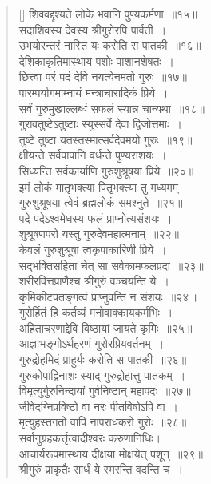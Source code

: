 \documentclass[twoside,12pt,notitlepage]{book}
\begin{document}
\begin{verse}[\versewidth]
शिववद्दृश्यते लोके भवानि पुण्यकर्मणा~॥१५॥\\
सदाशिवस्य देवस्य श्रीगुरोरपि पार्वती~।\\[-6pt]
उभयोरन्तरं नास्ति यः करोति स पातकी~॥१६॥\\
देशिकाकृतिमास्थाय पशोः पाशानशेषतः~।\\[-6pt]
छित्त्वा परं पदं देवि नयत्येनमतो गुरुः~॥१७॥\footA  \\
पारम्पर्यागमाम्नायं मन्त्राचारादिकं प्रिये~।\\[-6pt]
सर्वं गुरुमुखाल्लब्धं सफलं स्यान्न चान्यथा~॥१८॥\\
गुरावतुष्टेऽतुष्टाः स्युस्सर्वे देवा द्विजोत्तमाः~।\\[-6pt]
तुष्टे तुष्टा यतस्तस्मात्सर्वदेवमयो गुरुः~॥१९॥\\
क्षीयन्ते सर्वपापानि वर्धन्ते पुण्यराशयः~।\\[-6pt]
सिध्यन्ति सर्वकार्याणि गुरुशुश्रूषया प्रिये~॥२०॥\\
इमं लोकं मातृभक्त्या पितृभक्त्या तु मध्यमम्~।\\[-6pt]
गुरुशुश्रूषया त्वेवं ब्रह्मलोकं समश्नुते~॥२१॥\\
पदे पदेऽश्वमेधस्य फलं प्राप्नोत्यसंशयः~।\\[-6pt]
शुश्रूषणपरो यस्तु गुरुदेवमहात्मनाम्~॥२२॥\\
केवलं गुरुशुश्रूषा त्वकृपाकारिणी प्रिये~।\\[-6pt]
सद्भक्तिसहिता चेत् सा सर्वकामफलप्रदा~॥२३॥\\
शरीरवित्तप्राणैश्च श्रीगुरुं वञ्चयन्ति ये~।\\[-6pt]
कृमिकीटपतङ्गत्वं प्राप्नुवन्ति न संशयः~॥२४॥\\
गुरोर्हितं हि कर्तव्यं मनोवाक्कायकर्मभिः~।\\[-6pt]
अहिताचरणाद्देवि विष्ठायां जायते कृमिः~॥२५॥\\
आज्ञाभङ्गोऽर्थहरणं गुरोरप्रियवर्तनम्~।\\[-6pt]
गुरुद्रोहमिदं प्राहुर्यः करोति स पातकी~॥२६॥\\
गुरुकोपाद्विनाशः स्याद् गुरुद्रोहात्तु पातकम्~।\\[-6pt]
विमृत्युर्गुरुनिन्दायां गुर्वनिष्टान् महापदः~॥२७॥\\
जीवेदग्निप्रविष्टो वा नरः पीतविषोऽपि वा~।\\[-6pt]
मृत्युहस्तगतो वापि नापराधकरो गुरोः~॥२८॥ \\
सर्वानुग्रहकर्त्तृत्वादीश्वरः करुणानिधिः।\\[-6pt]
आचार्यरूपमास्थाय दीक्षया मोक्षयेत् पशून्~॥२९॥ \\   
श्रीगुरुं प्राकृतैः सार्धं ये स्मरन्ति वदन्ति च~।\\[-6pt]

\end{verse}
\end{document}
